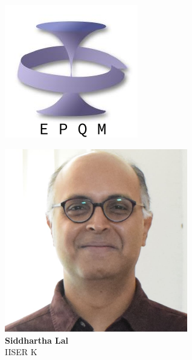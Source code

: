 \documentclass[aspectratio=169]{beamer}
\begin{document}
\begin{frame}{}
\hspace*{\fill}
\begin{minipage}{0.1\textwidth}
	\includegraphics[width=\textwidth]{epqm_logo_mod.jpeg}
\end{minipage}
\begin{minipage}{0.25\textwidth}
	\centering
	\includegraphics[width=0.6\textwidth]{slal.jpg}\\
	\footnotesize{{\bf Siddhartha Lal}\\
	IISER K}
\end{minipage}
\begin{minipage}{0.25\textwidth}

\end{minipage}
\end{frame}
\end{document}
